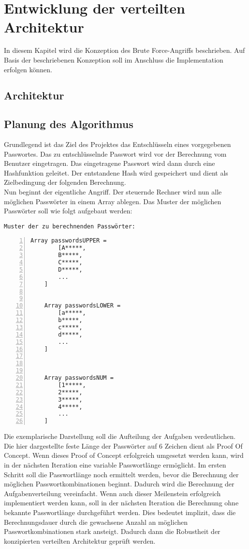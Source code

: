 \chapter{Entwicklung der verteilten Architektur}
\label{vorueberlegungen}
In diesem Kapitel wird die Konzeption des Brute Force-Angriffs beschrieben. Auf Basis der beschriebenen Konzeption soll im Anschluss die Implementation erfolgen können. 



\section{Architektur}


\section{Planung des Algorithmus}
\label{ideeBruteForce}
Grundlegend ist das Ziel des Projektes das Entschlüsseln eines vorgegebenen Passwortes. Das zu entschlüsselnde Passwort wird vor der Berechnung vom Benutzer eingetragen. Das eingetragene Passwort wird dann durch eine Hashfunktion geleitet. Der entstandene Hash wird gespeichert und dient als Zielbedingung der folgenden Berechnung. \\
Nun beginnt der eigentliche Angriff. Der steuernde Rechner wird nun alle möglichen Passwörter in einem Array ablegen. Das Muster der möglichen Passwörter soll wie folgt aufgebaut werden: 

\texttt{Muster der zu berechnenden Passwörter:}
\begin{lstlisting}[basicstyle=\ttfamily,numbers=left,numberstyle=\footnotesize\ttfamily,backgroundcolor=\color{sourcegray}]
	Array passwordsUPPER = 
		[A*****,
	 	B*****,
	 	C*****,
	 	D*****,
	 	...
	]
	
	
	Array passwordsLOWER = 
		[a*****,
	 	b*****,
	 	c*****,
	 	d*****,
		...
	]
	
	

	Array passwordsNUM = 
		[1*****,
	 	2*****,
	 	3*****,
	 	4*****,
		...
	]
\end{lstlisting}

Die exemplarische Darstellung soll die Aufteilung der Aufgaben verdeutlichen. Die hier dargestellte feste Länge der Passwörter auf 6 Zeichen dient als Proof Of Concept. Wenn dieses Proof of Concept erfolgreich umgesetzt werden kann, wird in der nächsten Iteration eine variable Passwortlänge ermöglicht. Im ersten Schritt soll die Passwortlänge noch ermittelt werden, bevor die Berechnung der möglichen Passwortkombinationen beginnt. Dadurch wird die Berechnung der Aufgabenverteilung vereinfacht. Wenn auch dieser Meilenstein erfolgreich implementiert werden kann, soll in der nächsten Iteration die Berechnung ohne bekannte Passwortlänge durchgeführt werden. Dies bedeutet implizit, dass die Berechnungsdauer durch die gewachsene Anzahl an möglichen Passwortkombinationen stark ansteigt. Dadurch dann die Robustheit der konzipierten verteilten Architektur geprüft werden. \\

